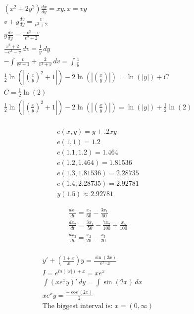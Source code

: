 \documentclass[12pt]{article}
\begin{document}
\begin{equation}
  \begin{split}
    (x^2+2y^2)\frac{dx}{dy}=xy, x=vy \\
    v+y\frac{dv}{dy}= \frac{v}{v^2+2} \\
    y\frac{dv}{dy}=\frac{-v^3-v}{v^2+2} \\
    \frac{v^2+2}{-v^3-v}\,dv=\frac{1}{y}\,dy\\
    -\int\frac{v}{v^2+1}+\frac{2}{v^3+v}\,dv=\int\frac{1}{y}\\
    \frac{1}{2}\ln(|(\frac{x}{y})^2+1|)-2\ln(|(\frac{x}{y})|)=\ln(|y|)+C\\
    C=\frac{1}{2}\ln(2)\\
    \frac{1}{2}\ln(|(\frac{x}{y})^2+1|)-2\ln(|(\frac{x}{y})|)=\ln(|y|)+\frac{1}{2}\ln(2)\\
  \end{split}
  \label{8}
\end{equation}


\hline
\begin{equation}
  \begin{split}
    e(x,y)=y+.2xy\\
    e(1,1)=1.2\\
    e(1.1,1.2)=1.464\\
    e(1.2,1.464)=1.81536\\
    e(1.3,1.81536)=2.28735\\
    e(1.4,2.28735)=2.92781\\
    y(1.5)\approx2.92781
  \end{split}
  \label{9}
\end{equation}

\hline
\begin{equation}
  \begin{split}
    \frac{dx_1}{dt}=\frac{x_2}{50}-\frac{3x_1}{50}\\
    \frac{dx_2}{dt}=\frac{3x_1}{50}-\frac{7x_2}{100}+\frac{x_3}{100}\\
    \frac{dx_3}{dt}=\frac{x_2}{20}-\frac{x_3}{20}\\
  \end{split}
  \label{10}
\end{equation}
\hline

\begin{equation}
  \begin{split}
  y'+\left( \frac{1+x}{x} \right)y=\frac{\sin(2x)}{e^x \cdot x}\\
  I=e^{ln(|x|)+x}=xe^x\\
  \int\left( xe^x y \right)'\,dy=\int \sin(2x)\,dx\\
  xe^x y=\frac{-\cos(2x)}{2}\\
  \text{The biggest interval is: } x = (0,\infty)
  \end{split}
  \label{11}
\end{equation}
\hline
\end{document}
